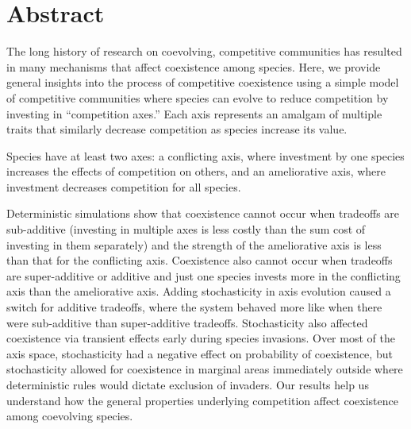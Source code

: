 \section*{Abstract}




The long history of research on coevolving, competitive communities has resulted in 
many mechanisms that affect coexistence among species.
Here, we provide general insights into the process of competitive coexistence
using a simple model of competitive communities where species can evolve to reduce 
competition by investing in ``competition axes.''
Each axis represents an amalgam of multiple traits that similarly decrease
competition as species increase its value.

Species have at least two axes:
a conflicting axis, where investment by one species increases the effects of
competition on others, and 
an ameliorative axis, where investment decreases competition for all species.

Deterministic simulations show that coexistence cannot occur when tradeoffs are 
sub-additive (investing in multiple axes is less costly than the sum cost of 
investing in them separately) and the strength of the
ameliorative axis is less than that for the conflicting axis.
Coexistence also cannot occur when tradeoffs are 
super-additive or additive and just one species invests more in the conflicting axis
than the ameliorative axis.
Adding stochasticity in axis evolution caused a switch for additive tradeoffs, 
where the system behaved more like when there were sub-additive than super-additive 
tradeoffs.
Stochasticity also affected coexistence via transient effects early during
species invasions.
Over most of the axis space, stochasticity had a negative effect
on probability of coexistence, but stochasticity allowed for coexistence
in marginal areas immediately outside where deterministic rules
would dictate exclusion of invaders.
Our results help us understand how the general properties underlying
competition affect coexistence among coevolving species.



